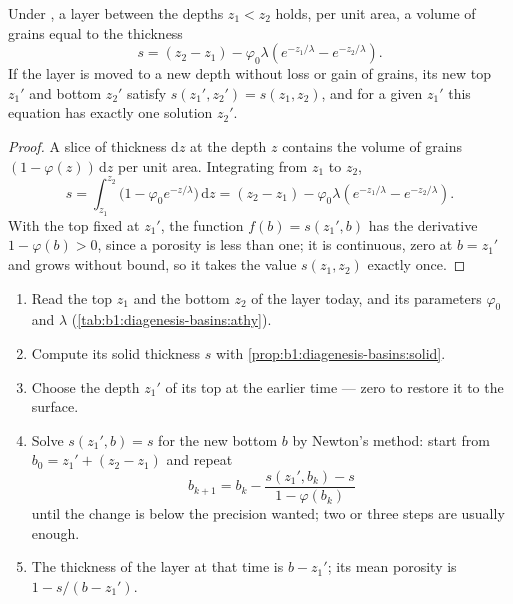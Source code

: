 \begin{proposition}\label{prop:b1:diagenesis-basins:solid}
Under , a layer between the depths $z_1 < z_2$ holds, per unit area, a
volume of grains equal to the thickness
\[
  s = (z_2 - z_1) - \varphi_0 \lambda \left( e^{-z_1/\lambda} - e^{-z_2/\lambda} \right).
\]
If the layer is moved to a new depth without loss or gain of grains, its new top
$z_1'$ and bottom $z_2'$ satisfy $s(z_1', z_2') = s(z_1, z_2)$, and for a given
$z_1'$ this equation has exactly one solution $z_2'$.
\end{proposition}

\begin{proof}
A slice of thickness $\mathrm dz$ at the depth $z$ contains the volume of grains
$(1 - \varphi(z))\,\mathrm dz$ per unit area. Integrating from $z_1$ to $z_2$,
\[
  s = \int_{z_1}^{z_2} \bigl(1 - \varphi_0 e^{-z/\lambda}\bigr)\,\mathrm dz
    = (z_2 - z_1) - \varphi_0\lambda\left(e^{-z_1/\lambda} - e^{-z_2/\lambda}\right).
\]
With the top fixed at $z_1'$, the function $f(b) = s(z_1', b)$ has the
derivative $1 - \varphi(b) > 0$, since a porosity is less than one; it is
continuous, zero at $b = z_1'$ and grows without bound, so it takes the value
$s(z_1, z_2)$ exactly once.
\end{proof}

\begin{method}\label{met:b1:diagenesis-basins:decompaction}
\begin{enumerate}
  \item Read the top $z_1$ and the bottom $z_2$ of the layer today, and its
        parameters $\varphi_0$ and $\lambda$
        (\cref{tab:b1:diagenesis-basins:athy}).
  \item Compute its solid thickness $s$ with
        \cref{prop:b1:diagenesis-basins:solid}.
  \item Choose the depth $z_1'$ of its top at the earlier time --- zero to
        restore it to the surface.
  \item Solve $s(z_1', b) = s$ for the new bottom $b$ by Newton's method:
        start from $b_0 = z_1' + (z_2 - z_1)$ and repeat
        \[
          b_{k+1} = b_k - \frac{s(z_1', b_k) - s}{1 - \varphi(b_k)}
        \]
        until the change is below the precision wanted; two or three steps are
        usually enough.
  \item The thickness of the layer at that time is $b - z_1'$; its mean
        porosity is $1 - s/(b - z_1')$.
\end{enumerate}
\end{method}

